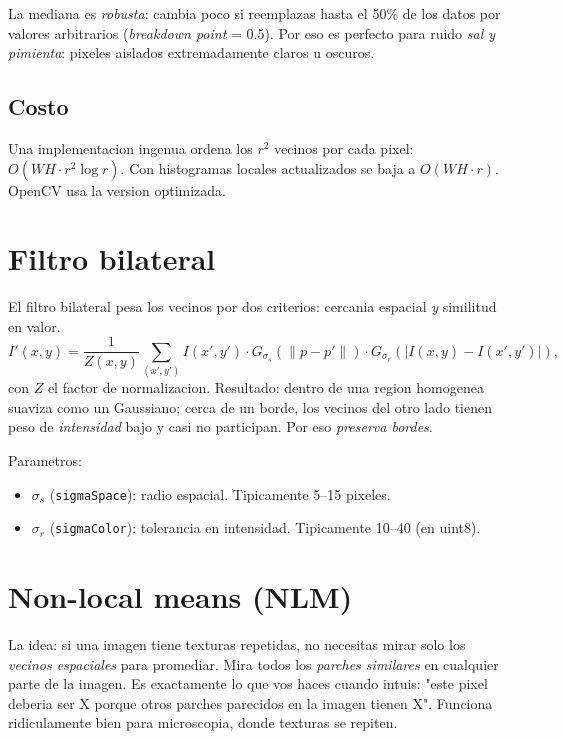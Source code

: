 \documentclass[11pt,a4paper,twoside,openright]{book}
\begin{document}
La mediana es \emph{robusta}: cambia poco si reemplazas hasta el 50\% de los datos por valores arbitrarios (\emph{breakdown point} = 0.5). Por eso es perfecto para ruido \emph{sal y pimienta}: pixeles aislados extremadamente claros u oscuros.

\subsection{Costo}

Una implementacion ingenua ordena los $r^2$ vecinos por cada pixel: $O(WH \cdot r^2 \log r)$. Con histogramas locales actualizados se baja a $O(WH \cdot r)$. OpenCV usa la version optimizada.

\section{Filtro bilateral}

El filtro bilateral pesa los vecinos por dos criterios: cercania espacial \emph{y} similitud en valor.
\begin{equation}
I'(x,y) = \frac{1}{Z(x,y)} \sum_{(x',y')} I(x',y') \cdot G_{\sigma_s}(\|p - p'\|) \cdot G_{\sigma_r}(|I(x,y)-I(x',y')|),
\end{equation}
con $Z$ el factor de normalizacion. Resultado: dentro de una region homogenea suaviza como un Gaussiano; cerca de un borde, los vecinos del otro lado tienen peso de \emph{intensidad} bajo y casi no participan. Por eso \emph{preserva bordes}.

Parametros:
\begin{itemize}[leftmargin=2em]
  \item $\sigma_s$ (\texttt{sigmaSpace}): radio espacial. Tipicamente 5--15 pixeles.
  \item $\sigma_r$ (\texttt{sigmaColor}): tolerancia en intensidad. Tipicamente 10--40 (en uint8).
\end{itemize}

\section{Non-local means (NLM)}

\begin{intuibox}
La idea: si una imagen tiene texturas repetidas, no necesitas mirar solo los \emph{vecinos espaciales} para promediar. Mira todos los \emph{parches similares} en cualquier parte de la imagen. Es exactamente lo que vos haces cuando intuis: "este pixel deberia ser X porque otros parches parecidos en la imagen tienen X". Funciona ridiculamente bien para microscopia, donde texturas se repiten.
\end{intuibox}
\end{document}

